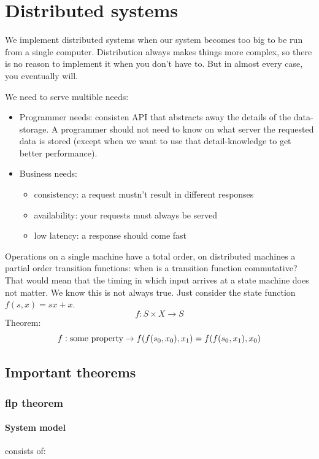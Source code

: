 \section{Distributed systems}

We implement distributed systems when our system becomes too big to be run from a single computer. Distribution always makes things more complex, so there is no reason to implement it when you don't have to. But in almost every case, you eventually will. 

We need to serve multible needs: 
\begin{itemize}
    \item Programmer needs: consisten API that abstracts away the details of the data-storage. A programmer should not need to know on what server the requested data is stored (except when we want to use that detail-knowledge to get better performance).
    
    \item Business needs: 
        \begin{itemize}
            \item consistency: a request mustn't result in different responses
            \item availability: your requests must always be served
            \item low latency: a response should come fast
        \end{itemize}
\end{itemize}


Operations on a single machine have a total order, on distributed machines a partial order
transition functions: when is a transition function commutative? That would mean that the timing in which input arrives at a state machine does not matter. We know this is not always true. Just consider the state function $f(s, x) = sx + x$. 
$$ f : S \times X \to S$$
Theorem:
$$ f: \text{some property} \to f(f(s_0, x_0), x_1) = f(f(s_0, x_1), x_0)$$

\subsection{Important theorems}
\subsubsection{flp theorem}
\paragraph{System model} consists of:
